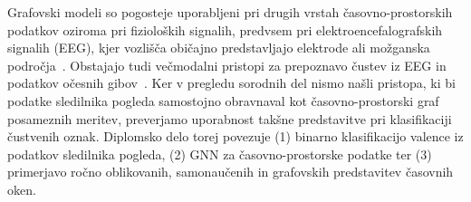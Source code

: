 Grafovski modeli so pogosteje uporabljeni pri drugih vrstah časovno-prostorskih podatkov oziroma pri fizioloških signalih, predvsem pri elektroencefalografskih signalih (EEG), kjer vozlišča običajno predstavljajo elektrode ali možganska področja~\cite{song2020dgcnn,zhong2022rgnn,liu2024gnn_eeg_survey}.
Obstajajo tudi večmodalni pristopi za prepoznavo čustev iz EEG in podatkov očesnih gibov~\cite{wu2021emotion,lu2015combining_eye_eeg}.
Ker v pregledu sorodnih del nismo našli pristopa, ki bi podatke sledilnika pogleda samostojno obravnaval kot časovno-prostorski graf posameznih meritev, preverjamo uporabnost takšne predstavitve pri klasifikaciji čustvenih oznak.
Diplomsko delo torej povezuje (1) binarno klasifikacijo valence iz podatkov sledilnika pogleda, (2) GNN za časovno-prostorske podatke ter (3) primerjavo ročno oblikovanih, samonaučenih in grafovskih predstavitev časovnih oken.
\newpage
